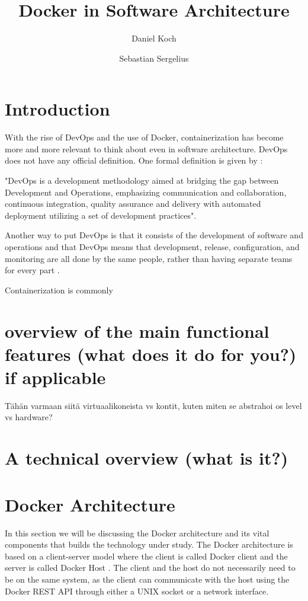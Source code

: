 \documentclass[fleqn,12pt]{olplainarticle}
\title{Docker in Software Architecture}
\author[1]{Daniel Koch}
\author[2]{Sebastian Sergelius}
\affil[1]{daniel.koch@helsinki.fi}
\affil[2]{github.com/sebazai}
\begin{document}
\flushbottom
\maketitle
\thispagestyle{empty}

\section*{Introduction}

With the rise of DevOps and the use of Docker, containerization has become more and more relevant to think about even
in software architecture. DevOps does not have any official definition.
One formal definition is given by \cite{Jabbari_devops}: 
\begin{displayquote}
"DevOps is a development methodology aimed at bridging the gap between Development and Operations, emphasizing communication and collaboration, continuous integration, quality assurance and delivery with automated deployment utilizing a set of development practices".
\end{displayquote}
Another way to put DevOps is that it consists of the development of software and operations and that DevOps means that development, release, configuration, and monitoring are all done by the same people, rather than having separate teams for every part \citep{hy:DevOps_with_Docker}.

Containerization is commonly


\section*{overview of the main functional features (what does it do for you?) if applicable}

Tähän varmaan siitä virtuaalikoneista vs kontit, kuten miten se abstrahoi os level vs hardware?

\section*{A technical overview (what is it?)}

\section*{Docker Architecture}

In this section we will be discussing the Docker architecture and its vital components that builds the technology under study. The Docker architecture is based on a client-server model where the client is called Docker client and the server is called Docker Host \citep{docker:overview}. The client and the host do not necessarily need to be on the same system, as the client can communicate with the host using the Docker REST API through either a UNIX socket or a network interface. 
\end{document}
